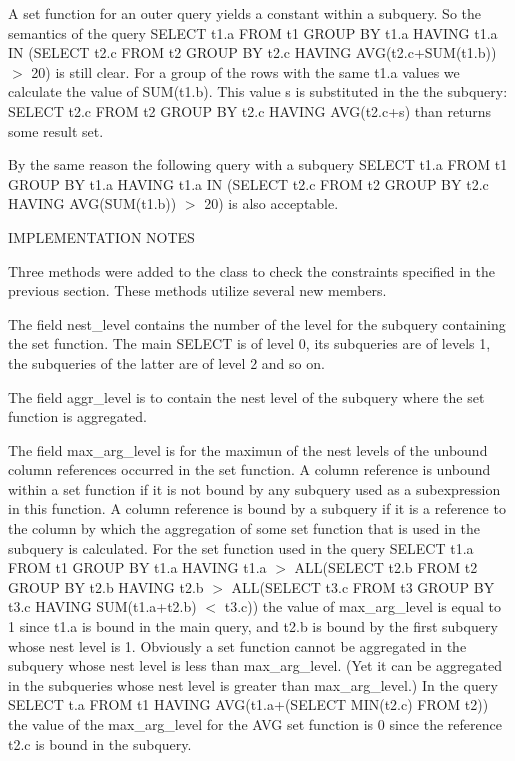 A set function for an outer query yields a constant within a subquery. So the semantics of the query S\+E\+L\+E\+CT t1.\+a F\+R\+OM t1 G\+R\+O\+UP BY t1.\+a H\+A\+V\+I\+NG t1.\+a IN (S\+E\+L\+E\+CT t2.\+c F\+R\+OM t2 G\+R\+O\+UP BY t2.\+c H\+A\+V\+I\+NG A\+VG(t2.\+c+S\+UM(t1.\+b)) $>$ 20) is still clear. For a group of the rows with the same t1.\+a values we calculate the value of S\+UM(t1.\+b). This value \textquotesingle{}s\textquotesingle{} is substituted in the the subquery\+: S\+E\+L\+E\+CT t2.\+c F\+R\+OM t2 G\+R\+O\+UP BY t2.\+c H\+A\+V\+I\+NG A\+VG(t2.\+c+s) than returns some result set.

By the same reason the following query with a subquery S\+E\+L\+E\+CT t1.\+a F\+R\+OM t1 G\+R\+O\+UP BY t1.\+a H\+A\+V\+I\+NG t1.\+a IN (S\+E\+L\+E\+CT t2.\+c F\+R\+OM t2 G\+R\+O\+UP BY t2.\+c H\+A\+V\+I\+NG A\+VG(S\+UM(t1.\+b)) $>$ 20) is also acceptable.

I\+M\+P\+L\+E\+M\+E\+N\+T\+A\+T\+I\+ON N\+O\+T\+ES

Three methods were added to the class to check the constraints specified in the previous section. These methods utilize several new members.

The field \textquotesingle{}nest\+\_\+level\textquotesingle{} contains the number of the level for the subquery containing the set function. The main S\+E\+L\+E\+CT is of level 0, its subqueries are of levels 1, the subqueries of the latter are of level 2 and so on.

The field \textquotesingle{}aggr\+\_\+level\textquotesingle{} is to contain the nest level of the subquery where the set function is aggregated.

The field \textquotesingle{}max\+\_\+arg\+\_\+level\textquotesingle{} is for the maximun of the nest levels of the unbound column references occurred in the set function. A column reference is unbound within a set function if it is not bound by any subquery used as a subexpression in this function. A column reference is bound by a subquery if it is a reference to the column by which the aggregation of some set function that is used in the subquery is calculated. For the set function used in the query S\+E\+L\+E\+CT t1.\+a F\+R\+OM t1 G\+R\+O\+UP BY t1.\+a H\+A\+V\+I\+NG t1.\+a $>$ A\+LL(S\+E\+L\+E\+CT t2.\+b F\+R\+OM t2 G\+R\+O\+UP BY t2.\+b H\+A\+V\+I\+NG t2.\+b $>$ A\+LL(S\+E\+L\+E\+CT t3.\+c F\+R\+OM t3 G\+R\+O\+UP BY t3.\+c H\+A\+V\+I\+NG S\+UM(t1.\+a+t2.\+b) $<$ t3.\+c)) the value of max\+\_\+arg\+\_\+level is equal to 1 since t1.\+a is bound in the main query, and t2.\+b is bound by the first subquery whose nest level is 1. Obviously a set function cannot be aggregated in the subquery whose nest level is less than max\+\_\+arg\+\_\+level. (Yet it can be aggregated in the subqueries whose nest level is greater than max\+\_\+arg\+\_\+level.) In the query S\+E\+L\+E\+CT t.\+a F\+R\+OM t1 H\+A\+V\+I\+NG A\+VG(t1.\+a+(S\+E\+L\+E\+CT M\+IN(t2.\+c) F\+R\+OM t2)) the value of the max\+\_\+arg\+\_\+level for the A\+VG set function is 0 since the reference t2.\+c is bound in the subquery.

